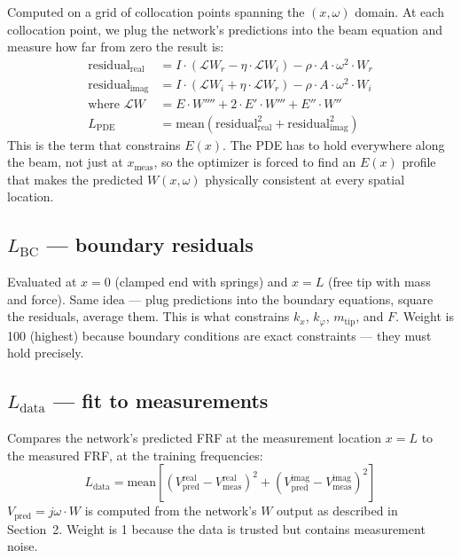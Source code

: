 \documentclass[11pt,a4paper]{article}
\begin{document}
Computed on a grid of collocation points spanning the $(x, \omega)$ domain. At each collocation point, we plug the network's predictions into the beam equation and measure how far from zero the result is:
\begin{align}
\text{residual}_\text{real} &= I \cdot (\mathcal{L}W_r - \eta \cdot \mathcal{L}W_i) - \rho \cdot A \cdot \omega^2 \cdot W_r \\
\text{residual}_\text{imag} &= I \cdot (\mathcal{L}W_i + \eta \cdot \mathcal{L}W_r) - \rho \cdot A \cdot \omega^2 \cdot W_i \\
\text{where } \mathcal{L}W &= E \cdot W'''' + 2 \cdot E' \cdot W''' + E'' \cdot W'' \\
L_\text{PDE} &= \text{mean}(\text{residual}_\text{real}^2 + \text{residual}_\text{imag}^2)
\end{align}
This is the term that constrains $E(x)$. The PDE has to hold everywhere along the beam, not just at $x_\text{meas}$, so the optimizer is forced to find an $E(x)$ profile that makes the predicted $W(x, \omega)$ physically consistent at every spatial location.

\subsection{\texorpdfstring{$L_\text{BC}$}{L\_BC} --- boundary residuals}

Evaluated at $x = 0$ (clamped end with springs) and $x = L$ (free tip with mass and force). Same idea --- plug predictions into the boundary equations, square the residuals, average them. This is what constrains $k_x$, $k_\varphi$, $m_\text{tip}$, and $F$. Weight is 100 (highest) because boundary conditions are exact constraints --- they must hold precisely.

\subsection{\texorpdfstring{$L_\text{data}$}{L\_data} --- fit to measurements}

Compares the network's predicted FRF at the measurement location $x = L$ to the measured FRF, at the training frequencies:
\begin{equation}
L_\text{data} = \text{mean}\!\left[(V_\text{pred}^\text{real} - V_\text{meas}^\text{real})^2 + (V_\text{pred}^\text{imag} - V_\text{meas}^\text{imag})^2\right]
\end{equation}
$V_\text{pred} = j\omega \cdot W$ is computed from the network's $W$ output as described in Section~2. Weight is 1 because the data is trusted but contains measurement noise.
\end{document}
